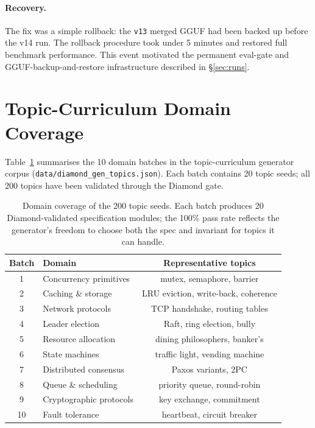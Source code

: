 \documentclass[11pt]{article}
\begin{document}
\paragraph{Recovery.}  The fix was a simple rollback: the \texttt{v13}
merged GGUF had been backed up before the v14 run.  The rollback
procedure took under 5 minutes and restored full benchmark performance.
This event motivated the permanent eval-gate and GGUF-backup-and-restore
infrastructure described in \S\ref{sec:runs}.

\section{Topic-Curriculum Domain Coverage}
\label{app:topic-domains}

Table~\ref{tab:topic-domains} summarises the 10 domain batches in the
topic-curriculum generator corpus
(\texttt{data/diamond\_gen\_topics.json}).  Each batch contains 20
topic seeds; all 200 topics have been validated through the Diamond gate.

\begin{table}[h!]
\centering
\small
\begin{tabular}{@{}clc@{}}
\toprule
Batch & Domain & Representative topics \\
\midrule
1 & Concurrency primitives & mutex, semaphore, barrier \\
2 & Caching \& storage & LRU eviction, write-back, coherence \\
3 & Network protocols & TCP handshake, routing tables \\
4 & Leader election & Raft, ring election, bully \\
5 & Resource allocation & dining philosophers, banker's \\
6 & State machines & traffic light, vending machine \\
7 & Distributed consensus & Paxos variants, 2PC \\
8 & Queue \& scheduling & priority queue, round-robin \\
9 & Cryptographic protocols & key exchange, commitment \\
10 & Fault tolerance & heartbeat, circuit breaker \\
\bottomrule
\end{tabular}
\caption{Domain coverage of the 200 topic seeds.  Each batch produces
20 Diamond-validated specification modules; the 100\% pass rate reflects
the generator's freedom to choose both the spec and invariant for topics
it can handle.}
\label{tab:topic-domains}
\end{table}
\end{document}
